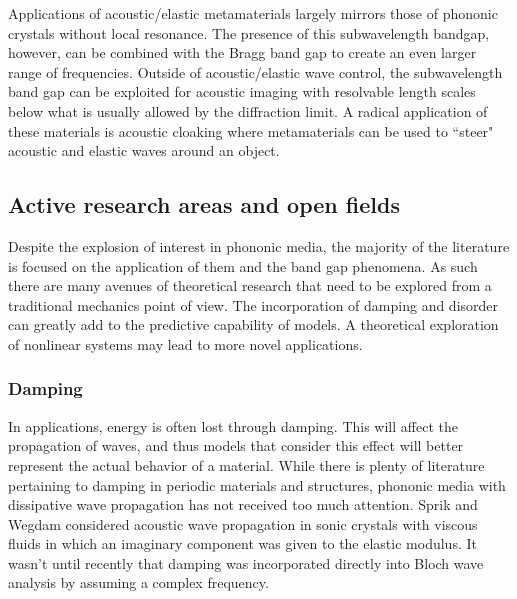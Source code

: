\documentclass{article}
\begin{document}
Applications of acoustic/elastic metamaterials largely mirrors those of 
phononic crystals without local resonance. The presence of this subwavelength 
bandgap, however, can be combined with the Bragg band gap to create an even 
larger range of frequencies. Outside of acoustic/elastic wave control, the 
subwavelength band gap can be exploited for acoustic imaging with resolvable 
length scales below what is usually allowed by the diffraction limit. A radical 
application of these materials is acoustic cloaking where metamaterials can be 
used to ``steer" acoustic and elastic waves around an object.


\subsection{Active research areas and open fields}
Despite the explosion of interest in phononic media, the majority of the 
literature is focused on the application of them and the band gap phenomena. As 
such there are many avenues of theoretical research that need to be explored 
from a traditional mechanics point of view. The incorporation of damping and 
disorder can greatly add to the predictive capability of models. A theoretical 
exploration of nonlinear systems may lead to more novel applications. 


\subsubsection{Damping}
In applications, energy is often lost through damping. This will affect the 
propagation of waves, and thus models that consider this effect will better 
represent the actual behavior of a material. While there is plenty of 
literature pertaining to damping in periodic materials and structures, phononic 
media with dissipative wave propagation has not received too much attention. 
Sprik and Wegdam considered acoustic wave propagation in sonic crystals with 
viscous fluids in which an imaginary component was given to the elastic 
modulus. It wasn't until recently that damping was incorporated directly into 
Bloch wave analysis by assuming a complex frequency. 
\end{document}
